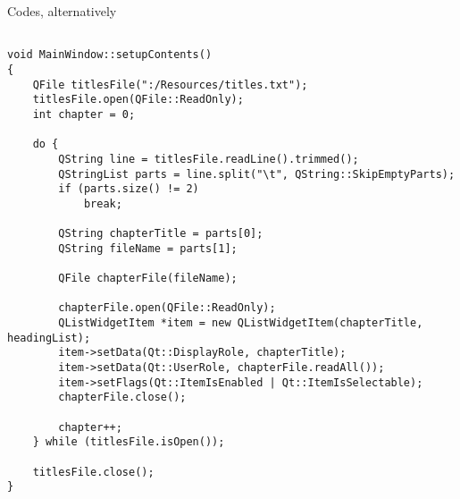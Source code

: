 \documentclass{article}
\begin{document}
Codes, alternatively
%

\begin{lstlisting}

void MainWindow::setupContents()
{
    QFile titlesFile(":/Resources/titles.txt");
    titlesFile.open(QFile::ReadOnly);
    int chapter = 0;

    do {
        QString line = titlesFile.readLine().trimmed();
        QStringList parts = line.split("\t", QString::SkipEmptyParts);
        if (parts.size() != 2)
            break;

        QString chapterTitle = parts[0];
        QString fileName = parts[1];

        QFile chapterFile(fileName);

        chapterFile.open(QFile::ReadOnly);
        QListWidgetItem *item = new QListWidgetItem(chapterTitle, headingList);
        item->setData(Qt::DisplayRole, chapterTitle);
        item->setData(Qt::UserRole, chapterFile.readAll());
        item->setFlags(Qt::ItemIsEnabled | Qt::ItemIsSelectable);
        chapterFile.close();

        chapter++;
    } while (titlesFile.isOpen());

    titlesFile.close();
}
\end{lstlisting}
 
\end{document}
